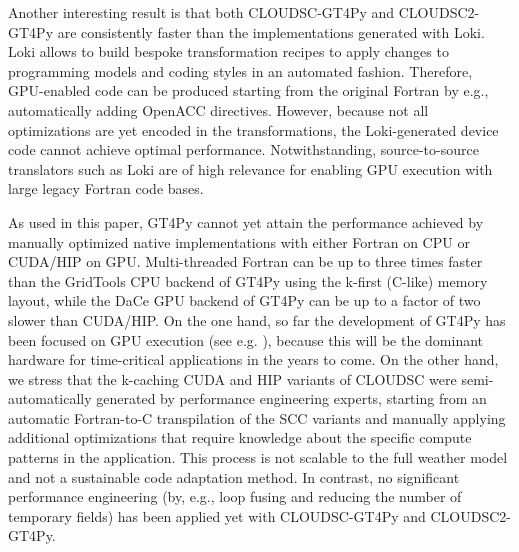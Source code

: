 \documentclass[gmd,manuscript,online]{copernicus}
\theoremstyle{theorem}
\theoremstyle{definition}
\theoremstyle{remark}
\theoremstyle{proposition}
\begin{document}
	Another interesting result is that both CLOUDSC-GT4Py and CLOUDSC2-GT4Py are consistently faster than the implementations generated with Loki. Loki allows to build bespoke transformation recipes to apply changes to programming models and coding styles in an automated fashion. Therefore, GPU-enabled code can be produced starting from the original Fortran by e.g., automatically adding OpenACC directives. However, because not all optimizations are yet encoded in the transformations, the Loki-generated device code cannot achieve optimal performance. Notwithstanding, source-to-source translators such as Loki are of high relevance for enabling GPU execution with large legacy Fortran code bases.

	As used in this paper, GT4Py cannot yet attain the performance achieved by manually optimized native implementations with either Fortran on CPU or CUDA/HIP on GPU. Multi-threaded Fortran can be up to three times faster than the GridTools CPU backend of GT4Py using the k-first (C-like) memory layout, while the DaCe GPU backend of GT4Py can be up to a factor of two slower than CUDA/HIP. On the one hand, so far the development of GT4Py has been focused on GPU execution (see e.g. \cite{dahm23}), because this will be the dominant hardware for time-critical applications in the years to come. On the other hand, we stress that the k-caching CUDA and HIP variants of CLOUDSC were semi-automatically generated by performance engineering experts, starting from an automatic Fortran-to-C transpilation of the SCC variants and manually applying additional optimizations that require knowledge about the specific compute patterns in the application. This process is not scalable to the full weather model and not a sustainable code adaptation method. In contrast, no significant performance engineering (by, e.g., loop fusing and reducing the number of temporary fields) has been applied yet with CLOUDSC-GT4Py and CLOUDSC2-GT4Py.
\end{document}
